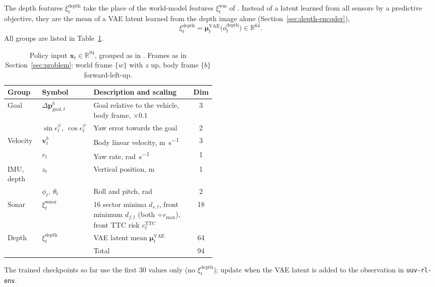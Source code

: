 The depth features $\xi^{\mathrm{depth}}_t$ take the place of the world-model features $\xi^{\mathrm{wm}}_t$ of \textcite{deowan2026unified}. Instead of a latent learned from all sensors by a predictive objective, they are the mean of a VAE latent learned from the depth image alone (Section~\ref{sec:depth-encoder}),
\begin{equation}
  \xi^{\mathrm{depth}}_t = \boldsymbol{\mu}^{\mathrm{VAE}}_t\bigl(o^{\mathrm{depth}}_t\bigr) \in \mathbb{R}^{64}.
  \label{eq:depth-features}
\end{equation}
All groups are listed in Table~\ref{tab:train_obs}.

\begin{table}[ht]
\centering
\caption{Policy input $\mathbf{x}_t \in \mathbb{R}^{94}$, grouped as in \textcite{deowan2026unified}. Frames as in Section~\ref{sec:problem}: world frame $\{w\}$ with $z$ up, body frame $\{b\}$ forward-left-up.}
\label{tab:train_obs}
\begin{tabular}{@{}llp{0.48\linewidth}c@{}}
\toprule
Group & Symbol & Description and scaling & Dim \\
\midrule
Goal     & $\Delta\mathbf{p}^b_{\mathrm{goal},t}$ & Goal relative to the vehicle, body frame, $\times 0.1$ & 3 \\
         & $\sin e^\psi_t,\ \cos e^\psi_t$ & Yaw error towards the goal & 2 \\
Velocity & $\mathbf{v}^b_t$ & Body linear velocity, \si{\metre\per\second} & 3 \\
         & $r_t$ & Yaw rate, \si{\radian\per\second} & 1 \\
IMU, depth & $z_t$ & Vertical position, \si{\metre} & 1 \\
         & $\phi_t,\ \theta_t$ & Roll and pitch, \si{\radian} & 2 \\
Sonar    & $\xi^{\mathrm{sonar}}_t$ & 16 sector minima $d_{s,t}$, front minimum $d_{f,t}$ (both $\div r_{\max}$), front TTC risk $c^{\mathrm{TTC}}_t$ & 18 \\
Depth    & $\xi^{\mathrm{depth}}_t$ & VAE latent mean $\boldsymbol{\mu}^{\mathrm{VAE}}_t$ & 64 \\
\midrule
         &  & Total & 94 \\
\bottomrule
\end{tabular}
\end{table}

\begin{todolist}
  \item The trained checkpoints so far use the first 30 values only (no $\xi^{\mathrm{depth}}_t$); update when the VAE latent is added to the observation in \texttt{uuv-rl-env}.
\end{todolist}

